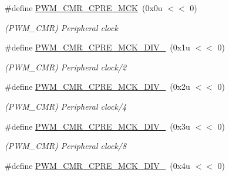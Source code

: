 \begin{DoxyCompactItemize}
\item 
\mbox{\label{group__SAME70__PWM_ga5d3f3920d928ba2aa52de186a445d0f4}} 
\#define \mbox{\hyperlink{group__SAME70__PWM_ga5d3f3920d928ba2aa52de186a445d0f4}{P\+W\+M\+\_\+\+C\+M\+R\+\_\+\+C\+P\+R\+E\+\_\+\+M\+CK}}~(0x0u $<$$<$ 0)
\begin{DoxyCompactList}\small\item\em (P\+W\+M\+\_\+\+C\+MR) Peripheral clock \end{DoxyCompactList}\item 
\mbox{\label{group__SAME70__PWM_ga37ce0b9a18a244345e0bfa53ca090dae}} 
\#define \mbox{\hyperlink{group__SAME70__PWM_ga37ce0b9a18a244345e0bfa53ca090dae}{P\+W\+M\+\_\+\+C\+M\+R\+\_\+\+C\+P\+R\+E\+\_\+\+M\+C\+K\+\_\+\+D\+I\+V\+\_}}~(0x1u $<$$<$ 0)
\begin{DoxyCompactList}\small\item\em (P\+W\+M\+\_\+\+C\+MR) Peripheral clock/2 \end{DoxyCompactList}\item 
\mbox{\label{group__SAME70__PWM_gaa64626b14684edb5448046b2ba3ddcdf}} 
\#define \mbox{\hyperlink{group__SAME70__PWM_gaa64626b14684edb5448046b2ba3ddcdf}{P\+W\+M\+\_\+\+C\+M\+R\+\_\+\+C\+P\+R\+E\+\_\+\+M\+C\+K\+\_\+\+D\+I\+V\+\_}}~(0x2u $<$$<$ 0)
\begin{DoxyCompactList}\small\item\em (P\+W\+M\+\_\+\+C\+MR) Peripheral clock/4 \end{DoxyCompactList}\item 
\mbox{\label{group__SAME70__PWM_gae7938e69e6d1c6f171c8f0cc14c18f61}} 
\#define \mbox{\hyperlink{group__SAME70__PWM_gae7938e69e6d1c6f171c8f0cc14c18f61}{P\+W\+M\+\_\+\+C\+M\+R\+\_\+\+C\+P\+R\+E\+\_\+\+M\+C\+K\+\_\+\+D\+I\+V\+\_}}~(0x3u $<$$<$ 0)
\begin{DoxyCompactList}\small\item\em (P\+W\+M\+\_\+\+C\+MR) Peripheral clock/8 \end{DoxyCompactList}\item 
\mbox{\label{group__SAME70__PWM_ga891db67f708bac4e03b331dbe2b9b736}} 
\#define \mbox{\hyperlink{group__SAME70__PWM_ga891db67f708bac4e03b331dbe2b9b736}{P\+W\+M\+\_\+\+C\+M\+R\+\_\+\+C\+P\+R\+E\+\_\+\+M\+C\+K\+\_\+\+D\+I\+V\+\_}}~(0x4u $<$$<$ 0)
$$
\end{DoxyCompactItemize}
